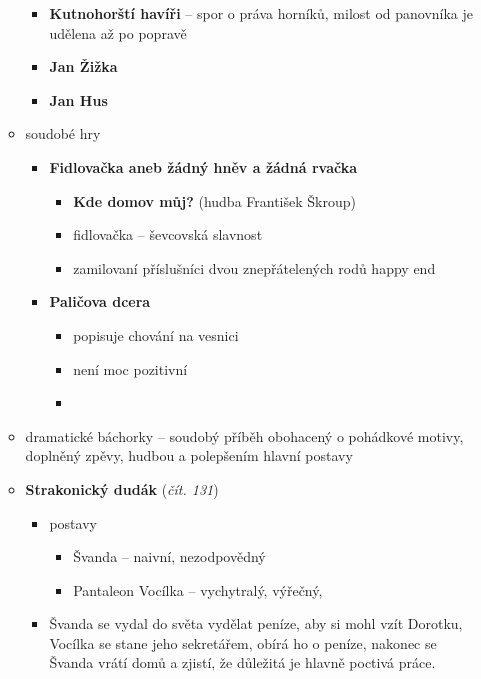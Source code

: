 \begin{itemize}
\begin{itemize}
		\begin{itemize}
		\item \textbf{Kutnohorští havíři} -- spor o práva horníků, milost od panovníka je udělena až po popravě
		\item \textbf{Jan Žižka}
		\item \textbf{Jan Hus}
		\end{itemize}
	\item soudobé hry
		\begin{itemize}
		\item \textbf{Fidlovačka aneb žádný hněv a žádná rvačka}
			\begin{itemize}
			\item \textbf{Kde domov můj?} (hudba František Škroup)
			\item fidlovačka -- ševcovská slavnost
			\item zamilovaní příslušníci dvou znepřátelených rodů \ra happy end
			\end{itemize}
		\item \textbf{Paličova dcera}
			\begin{itemize}
			\item popisuje chování na vesnici 
			\item není moc pozitivní
			\item 
			\end{itemize}
		\end{itemize}
	\item dramatické báchorky -- soudobý příběh obohacený o pohádkové motivy, doplněný zpěvy, hudbou a polepšením hlavní postavy
		\item \textbf{Strakonický dudák} (\textit{čít. 131})
		\begin{itemize}
		\item postavy
			\begin{itemize}
			\item Švanda -- naivní, nezodpovědný
			\item Pantaleon Vocílka -- vychytralý, výřečný, 
			\end{itemize}
		\item Švanda se vydal do světa vydělat peníze, aby si mohl vzít Dorotku, Vocílka se stane jeho  sekretářem, obírá ho o peníze, nakonec se Švanda vrátí domů a zjistí, že důležitá je hlavně poctivá práce.
		\end{itemize}
	\end{itemize}

\end{itemize}


